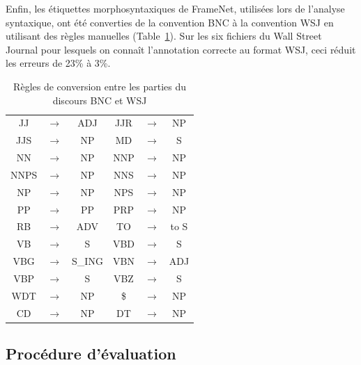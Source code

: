 Enfin, les étiquettes morphosyntaxiques de FrameNet, utilisées lors de
l'analyse syntaxique, ont été converties de la convention BNC à la convention
WSJ en utilisant des règles manuelles (Table~\ref{table:tagset_rules}). Sur les
six fichiers du Wall Street Journal pour lesquels on connaît l'annotation
correcte au format WSJ, ceci réduit les erreurs de 23\% à 3\%.

\begin{table}[ht]
    \centering
    \begin{tabular}{ccc|ccc}
        \toprule
        JJ   &$\to$& ADJ    & JJR  &$\to$& NP     \\
        JJS  &$\to$& NP     & MD   &$\to$& S      \\
        NN   &$\to$& NP     & NNP  &$\to$& NP     \\
        NNPS &$\to$& NP     & NNS  &$\to$& NP     \\
        NP   &$\to$& NP     & NPS  &$\to$& NP     \\
        PP   &$\to$& PP     & PRP  &$\to$& NP     \\  
        RB   &$\to$& ADV    & TO   &$\to$& to S   \\
        VB   &$\to$& S      & VBD  &$\to$& S      \\
        VBG  &$\to$& S\_ING & VBN  &$\to$& ADJ    \\
        VBP  &$\to$& S      & VBZ  &$\to$& S      \\
        WDT  &$\to$& NP     & \$   &$\to$& NP     \\  
        CD   &$\to$& NP     & DT   &$\to$& NP     \\
        \bottomrule
    \end{tabular}
    \caption{\protect\centering\label{table:tagset_rules}Règles de conversion entre les parties du discours BNC et WSJ}
\end{table}


\subsection{Procédure d'évaluation}

